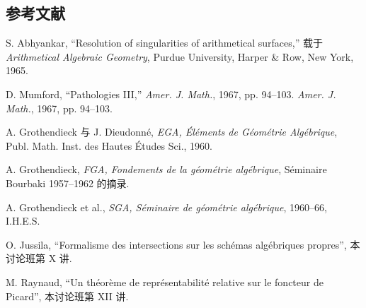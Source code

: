 \subsection*{参考文献}
\begin{enumerate}[label={[\arabic*]}]
\item S. Abhyankar, ``Resolution of singularities of arithmetical surfaces,'' 载于 \emph{Arithmetical Algebraic Geometry}, Purdue University, Harper \& Row, New York, 1965.
\item D. Mumford, ``Pathologies III,'' \emph{Amer. J. Math.}, 1967, pp. 94--103. \emph{Amer. J. Math.}, 1967, pp. 94--103.
\item A. Grothendieck 与 J. Dieudonn\'e, \emph{EGA, \'El\'ements de G\'eom\'etrie Alg\'ebrique}, Publ. Math. Inst. des Hautes \'Etudes Sci., 1960.
\item A. Grothendieck, \emph{FGA, Fondements de la g\'eom\'etrie alg\'ebrique}, S\'eminaire Bourbaki 1957--1962 的摘录.
\item A. Grothendieck et al., \emph{SGA, S\'eminaire de g\'eom\'etrie alg\'ebrique}, 1960--66, I.H.E.S.
\item O. Jussila, “Formalisme des intersections sur les sch\'emas alg\'ebriques propres”, 本讨论班第 X 讲.
\item M. Raynaud, “Un th\'eor\`eme de repr\'esentabilit\'e relative sur le foncteur de Picard”, 本讨论班第 XII 讲.
\end{enumerate}


